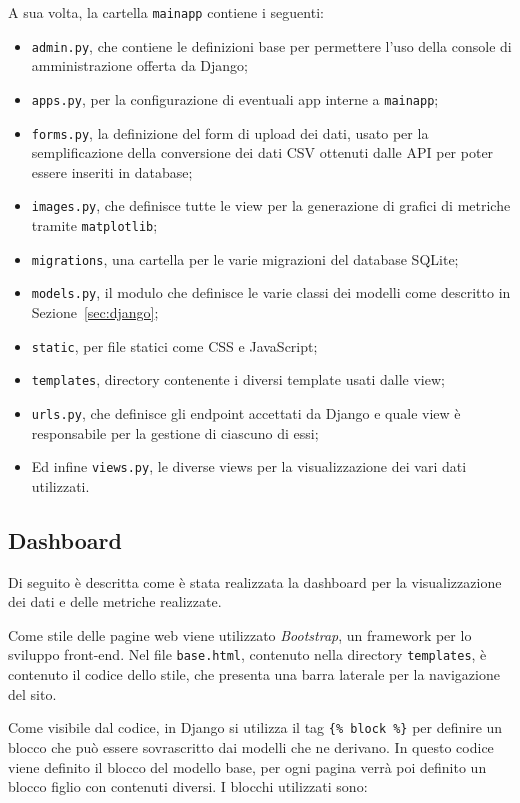 A sua volta, la cartella \texttt{mainapp} contiene i seguenti:
\begin{itemize}
  \item \texttt{admin.py}, che contiene le definizioni base per permettere l'uso
        della console di amministrazione offerta da Django;
  \item \texttt{apps.py}, per la configurazione di eventuali app interne a \texttt{mainapp};
  \item \texttt{forms.py}, la definizione del form di upload dei dati, usato per la
        semplificazione della conversione dei dati CSV ottenuti dalle API per
        poter essere inseriti in database;
  \item \texttt{images.py}, che definisce tutte le view per la generazione di
        grafici di metriche tramite \texttt{matplotlib};
  \item \texttt{migrations}, una cartella per le varie migrazioni del database SQLite;
  \item \texttt{models.py}, il modulo che definisce le varie classi dei modelli
        come descritto in Sezione~\ref{sec:django};
  \item \texttt{static}, per file statici come CSS e JavaScript;
  \item \texttt{templates}, directory contenente i diversi template usati dalle view;
  \item \texttt{urls.py}, che definisce gli endpoint accettati da Django e quale
        view è responsabile per la gestione di ciascuno di essi;
  \item Ed infine \texttt{views.py}, le diverse views per la visualizzazione
        dei vari dati utilizzati.
\end{itemize}





\subsection{Dashboard}
Di seguito è descritta come è stata realizzata la dashboard per la visualizzazione dei dati e delle metriche realizzate.

Come stile delle pagine web viene utilizzato \textit{Bootstrap}, un framework per lo sviluppo front-end. 
Nel file \texttt{base.html}, contenuto nella directory \texttt{templates}, è contenuto il codice dello stile, che presenta una barra laterale per la navigazione del sito.

Come visibile dal codice, in Django si utilizza il tag \texttt{\{\% block \%\}} per definire un blocco che può essere sovrascritto dai modelli che ne derivano. In questo codice viene definito il blocco del modello base, per ogni pagina verrà poi definito un blocco figlio con contenuti diversi. I blocchi utilizzati sono:


